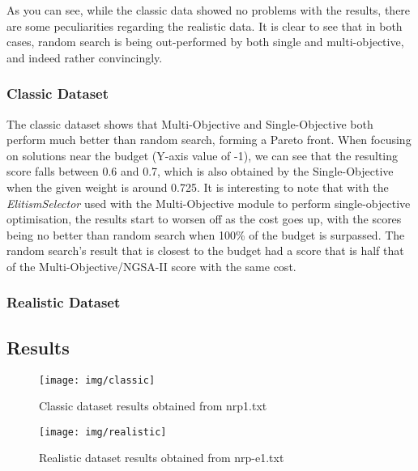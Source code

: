 \documentclass[11pt, a4paper]{article}
\begin{document}
As you can see, while the classic data showed no problems with the results,
there are some peculiarities regarding the realistic data. It is clear to see
that in both cases, random search is being out-performed by both single and
multi-objective, and indeed rather convincingly. 

\subsubsection{Classic Dataset} %
\label{ssub:classic_dataset}
The classic dataset shows that Multi-Objective and Single-Objective both perform
much better than random search, forming a Pareto front. When focusing on
solutions near the budget (Y-axis value of -1), we can see that the resulting
score falls between 0.6 and 0.7, which is also obtained by the Single-Objective
when the given weight is around 0.725. It is interesting to note that with
the \emph{ElitismSelector} used with the Multi-Objective module to perform
single-objective optimisation, the results start to worsen off as the cost goes
up, with the scores being no better than random search when 100\% of the budget
is surpassed. The random search's result that is closest to the budget had a
score that is half that of the Multi-Objective/NGSA-II score with the same cost.

\subsubsection{Realistic Dataset} %
\label{ssub:realistic_dataset}


\newpage
\subsection{Results} %
\label{sub:results}
\begin{figure}[H]
    \centering
    \texttt{[image: img/classic]}
    \caption{Classic dataset results obtained from nrp1.txt}
    \label{fig:classic}
\end{figure}

\begin{figure}[H]
    \centering
    \texttt{[image: img/realistic]}
    \caption{Realistic dataset results obtained from nrp-e1.txt}
    \label{fig:realistic}
\end{figure}

% 
%  
\end{document}
